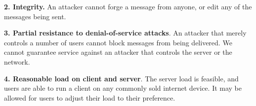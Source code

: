\textbf{2. Integrity.} An attacker cannot forge a message from anyone, or edit any of the messages being sent.

\textbf{3. Partial resistance to denial-of-service attacks}. An attacker that merely controls a number of users cannot block messages from being delivered. We cannot guarantee service against an attacker that controls the server or the network.

\textbf{4. Reasonable load on client and server}. The server load is feasible, and users are able to run a client on any commonly sold internet device. It may be allowed for users to adjust their load to their preference.

